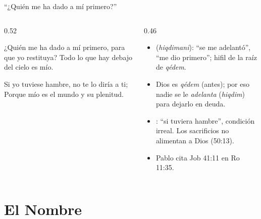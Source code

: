 \begin{frame}{``¿Quién me ha dado a mí primero?''}
\begin{columns}[t,onlytextwidth]
\begin{column}{0.52\textwidth}
\begin{center}\end{center}
\begin{cita}¿Quién me ha dado a mí primero, para que yo restituya? Todo lo que hay debajo del cielo es mío.\end{cita}
\begin{cita}Si yo tuviese hambre, no te lo diría a ti; Porque mío es el mundo y su plenitud.\end{cita}
\end{column}
\begin{column}{0.46\textwidth}\scriptsize
\begin{itemize}
\item {} (\emph{hiqdimani}): ``se me adelantó'', ``me dio primero''; hifil de la raíz de \emph{qédem}.
\item Dios es \emph{qédem} (antes); por eso nadie se le \emph{adelanta} (\emph{hiqdim}) para dejarlo en deuda.
\item {}: ``si tuviera hambre'', condición irreal. Los sacrificios no alimentan a Dios (50:13).
\item Pablo cita Job 41:11 en Ro 11:35.
\end{itemize}
\end{column}
\end{columns}
\end{frame}

\section{El Nombre}

